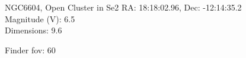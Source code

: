 \begin{block}{NGC6604, Open Cluster in Se2}
    RA: 18:18:02.96, Dec: -12:14:35.2 \\ 
    Magnitude (V): 6.5 \\ 
    Dimensions: 9.6 

    Finder fov: 60 
\end{block}